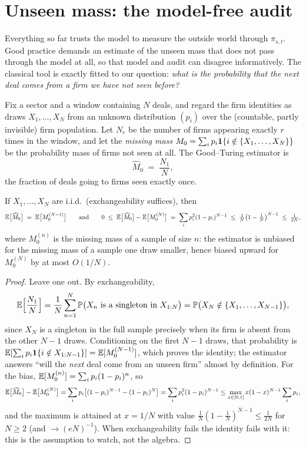 \section{Unseen mass: the model-free audit}\label{ch11:sec:unseen}

Everything so far trusts the model to measure the outside world through
$\pi_{s,t}$. Good practice demands an estimate of the unseen mass that
does not pass through the model at all, so that model and audit can
disagree informatively. The classical tool is exactly fitted to our
question: \emph{what is the probability that the next deal comes from a
firm we have not seen before?}

Fix a sector and a window containing $N$ deals, and regard the firm
identities as draws $X_1,\dots,X_N$ from an unknown distribution
$(p_i)$ over the (countable, partly invisible) firm population. Let
$N_r$ be the number of firms appearing exactly $r$ times in the window,
and let the \emph{missing mass} $M_0 = \sum_i p_i \mathbf{1}\{i \notin
\{X_1,\dots,X_N\}\}$ be the probability mass of firms not seen at all.
The Good--Turing estimator \citep{good1953} is
\begin{equation}\label{eq:ch11:gt}
\widehat M_0 \;=\; \frac{N_1}{N},
\end{equation}
the fraction of deals going to firms seen exactly once.

\begin{proposition}\label{prop:ch11:gt}
If $X_1,\dots,X_N$ are i.i.d.\ (exchangeability suffices), then
\[
\mathbb{E}\big[\widehat M_0\big] \;=\; \mathbb{E}\big[M_0^{(N-1)}\big]
\qquad\text{and}\qquad
0 \;\le\; \mathbb{E}\big[\widehat M_0\big] - \mathbb{E}\big[M_0^{(N)}\big]
 \;=\; \sum_i p_i^2 (1-p_i)^{N-1}
 \;\le\; \tfrac{1}{N}\big(1-\tfrac1N\big)^{N-1} \;\le\; \tfrac{1}{2N},
\]
where $M_0^{(n)}$ is the missing mass of a sample of size $n$: the
estimator is unbiased for the missing mass of a sample one draw smaller,
hence biased upward for $M_0^{(N)}$ by at most $O(1/N)$.
\end{proposition}

\begin{proof}
Leave one out. By exchangeability,
\[
\mathbb{E}\Big[\frac{N_1}{N}\Big]
 = \frac1N \sum_{n=1}^{N} \mathbb{P}\big(X_n \text{ is a singleton in } X_{1:N}\big)
 = \mathbb{P}\big(X_N \notin \{X_1,\dots,X_{N-1}\}\big),
\]
since $X_N$ is a singleton in the full sample precisely when its firm is
absent from the other $N-1$ draws. Conditioning on the first $N-1$
draws, that probability is $\mathbb{E}[\sum_i p_i \mathbf{1}\{i \notin X_{1:N-1}\}] =
\mathbb{E}[M_0^{(N-1)}]$, which proves the identity; the estimator answers
``will the \emph{next} deal come from an unseen firm'' almost by
definition. For the bias, $\mathbb{E}[M_0^{(n)}] = \sum_i p_i(1-p_i)^{n}$, so
\[
\mathbb{E}\big[\widehat M_0\big] - \mathbb{E}\big[M_0^{(N)}\big]
 = \sum_i p_i\big[(1-p_i)^{N-1} - (1-p_i)^{N}\big]
 = \sum_i p_i^2 (1-p_i)^{N-1}
 \le \max_{x\in[0,1]} x(1-x)^{N-1} \sum_i p_i,
\]
and the maximum is attained at $x = 1/N$ with value
$\frac1N(1-\frac1N)^{N-1} \le \frac1{2N}$ for $N\ge2$
(and $\to (eN)^{-1}$). When exchangeability fails the identity fails
with it: this is the assumption to watch, not the algebra.
\end{proof}

